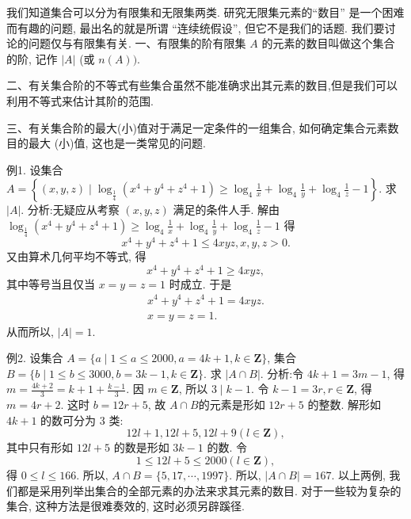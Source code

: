 
我们知道集合可以分为有限集和无限集两类.
研究无限集元素的“数目” 是一个困难而有趣的问题, 最出名的就是所谓 “连续统假设”, 但它不是我们的话题.
我们要讨论的问题仅与有限集有关.
一、有限集的阶有限集 $A$ 的元素的数目叫做这个集合的阶, 记作 $|A|$ (或 $n(A))$.



二、有关集合阶的不等式有些集合虽然不能准确求出其元素的数目,但是我们可以利用不等式来估计其阶的范围.



三、有关集合阶的最大(小)值对于满足一定条件的一组集合, 如何确定集合元素数目的最大 (小)值, 这也是一类常见的问题.



例1. 设集合 $A=\left\{(x, y, z) \mid \log _{\frac{1}{4}}\left(x^4+y^4+z^4+1\right) \geqslant \log _4 \frac{1}{x}+\log _4 \frac{1}{y}+\log _4 \frac{1}{z}-1\right\}$. 求 $|A|$.
分析:无疑应从考察 $(x, y, z)$ 满足的条件人手.
解由 $\log _{\frac{1}{4}}\left(x^4+y^4+z^4+1\right) \geqslant \log _4 \frac{1}{x}+\log _4 \frac{1}{y}+\log _4 \frac{1}{z}-1$ 得
$$
x^4+y^4+z^4+1 \leqslant 4 x y z, x, y, z>0 .
$$
又由算术几何平均不等式, 得
$$
x^4+y^4+z^4+1 \geqslant 4 x y z,
$$
其中等号当且仅当 $x=y=z=1$ 时成立.
于是
$$
\begin{gathered}
x^4+y^4+z^4+1=4 x y z . \\
x=y=z=1 .
\end{gathered}
$$
从而所以, $|A|=1$.



例2. 设集合 $A=\{a \mid 1 \leqslant a \leqslant 2000, a=4 k+1, k \in \mathbf{Z}\}$, 集合 $B= \{b \mid 1 \leqslant b \leqslant 3000, b=3 k-1, k \in \mathbf{Z}\}$. 求 $|A \cap B|$.
分析:令 $4 k+1=3 m-1$, 得 $m=\frac{4 k+2}{3}=k+1+\frac{k-1}{3}$. 因 $m \in \mathbf{Z}$, 所以 $3 \mid k-1$. 令 $k-1=3 r, r \in \mathbf{Z}$, 得 $m=4 r+2$. 这时 $b=12 r+5$, 故 $A \cap B$的元素是形如 $12 r+5$ 的整数.
解形如 $4 k+1$ 的数可分为 3 类:
$$
12 l+1,12 l+5,12 l+9(l \in \mathbf{Z}),
$$
其中只有形如 $12 l+5$ 的数是形如 $3 k-1$ 的数.
令
$$
1 \leqslant 12 l+5 \leqslant 2000(l \in \mathbf{Z}),
$$
得 $0 \leqslant l \leqslant 166$. 所以, $A \cap B=\{5,17, \cdots, 1997\}$.
所以, $|A \cap B|=167$.
以上两例, 我们都是采用列举出集合的全部元素的办法来求其元素的数目.
对于一些较为复杂的集合, 这种方法是很难奏效的, 这时必须另辟蹊径.



